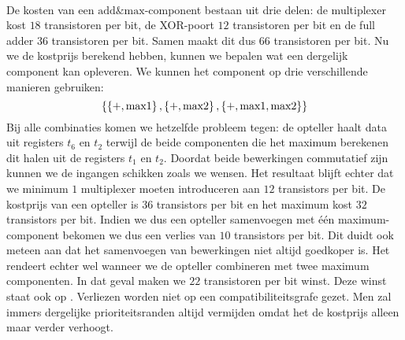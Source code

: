 \paragraph{}
De kosten van een $\mbox{add\&max}$-component bestaan uit drie delen: de multiplexer kost $18$ transistoren per bit, de XOR-poort $12$ transistoren per bit en de full adder $36$ transistoren per bit. Samen maakt dit dus $66$ transistoren per bit. Nu we de kostprijs berekend hebben, kunnen we bepalen wat een dergelijk component kan opleveren. We kunnen het component op drie verschillende manieren gebruiken:
\begin{equation}
\left\{ \left\{ +,\mbox{max1} \right\},\left\{ +,\mbox{max2} \right\},\left\{ +,\mbox{max1},\mbox{max2} \right\} \right\}
\end{equation}
Bij alle combinaties komen we hetzelfde probleem tegen: de opteller haalt data uit registers $t_6$ en $t_2$ terwijl de beide componenten die het maximum berekenen dit halen uit de registers $t_1$ en $t_2$. Doordat beide bewerkingen commutatief zijn kunnen we de ingangen schikken zoals we wensen. Het resultaat blijft echter dat we minimum $1$ multiplexer moeten introduceren aan $12$ transistors per bit. De kostprijs van een opteller is $36$ transistors per bit en het maximum kost $32$ transistors per bit. Indien we dus een opteller samenvoegen met \'e\'en maximum-component bekomen we dus een verlies van $10$ transistors per bit. Dit duidt ook meteen aan dat het samenvoegen van bewerkingen niet altijd goedkoper is. Het rendeert echter wel wanneer we de opteller combineren met twee maximum componenten. In dat geval maken we $22$ transistoren per bit winst. Deze winst staat ook op . Verliezen worden niet op een compatibiliteitsgrafe gezet. Men zal immers dergelijke prioriteitsranden altijd vermijden omdat het de kostprijs alleen maar verder verhoogt.
